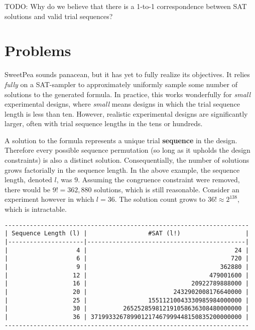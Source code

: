 TODO: Why do we believe that there is a 1-to-1 correspondence between SAT solutions and valid trial sequences?


\section{Problems}


SweetPea sounds panacean, but it has yet to fully realize its objectives. It relies \textit{fully} on a SAT-sampler to approximately uniformly sample some number of solutions to the generated formula. In practice, this works wonderfully for \textit{small} experimental designs, where \textit{small} means designs in which the trial sequence length is less than ten. However, realistic experimental designs are significantly larger, often with trial sequence lengths in the tens or hundreds.

A solution to the formula represents a unique trial \textbf{sequence} in the design. Therefore every possible sequence permutation (so long as it upholds the design constraints) is also a distinct solution. Consequentially, the number of solutions grows factorially in the sequence length. In the above example, the sequence length, denoted $l$, was $9$. Assuming the congruence constraint were removed, there would be $9! = 362,880$ solutions, which is still reasonable. Consider an experiment however in which $l = 36$. The solution count grows to $36! \approx 2^{138}$, which is intractable.

\begin{verbatim}
--------------------------------------------------------------------
| Sequence Length (l) |                 #SAT (l!)                  |
|---------------------|--------------------------------------------|
|                   4 |                                         24 |
|                   6 |                                        720 |
|                   9 |                                     362880 |
|                  12 |                                  479001600 |
|                  16 |                             20922789888000 |
|                  20 |                        2432902008176640000 |
|                  25 |                 15511210043330985984000000 |
|                  30 |          265252859812191058636308480000000 |
|                  36 | 371993326789901217467999448150835200000000 |
--------------------------------------------------------------------
\end{verbatim}

